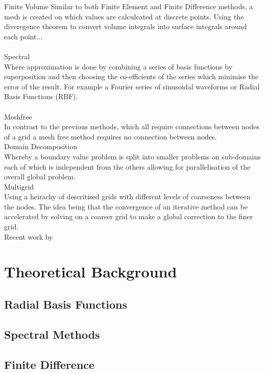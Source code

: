 \documentclass[a4paper]{amsart}
\begin{document}
\textperiodcentered Finite Volume
Similar to both Finite Element and Finite Difference methods, a mesh is created on which values are calculcated at discrete points. Using the diveregence theorem to convert volume integrals into surface integrals around each point...\\
\\ 
\textperiodcentered Spectral\\
Where approximation is done by combining a series of basis functions by superposition and then choosing the co-efficients of the series which minimise the error of the result. For example a Fourier series of sinusoidal waveforms or Radial Basis Functions (RBF).\\
\\ 
\textperiodcentered Meshfree\\
In contrast to the previous methods, which all require connections between nodes of a grid a mesh free method requires no connection between nodes.
\\ 
\textperiodcentered Domain Decomposition\\
Whereby a boundary value problem is split into smaller problems on sub-domains each of which is independent from the others allowing for parallelisation of the overall global problem.
\\ 
\textperiodcentered Multigrid\\
Using a heirachy of descritised grids with different levels of coarseness between the nodes. The idea being that the convergence of an iterative method can be accelerated by solving on a coarser grid to make a global correction to the finer grid.
\\
Recent work by

\section{Theoretical Background}

\subsection{Radial Basis Functions}

\subsection{Spectral Methods}

\subsection{Finite Difference}
\end{document}
